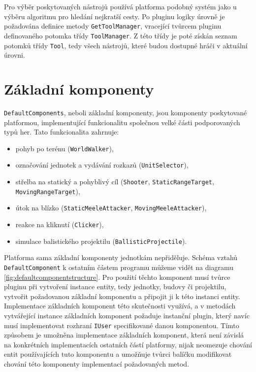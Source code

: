 Pro výběr poskytovaných nástrojů používá platforma podobný systém jako u výběru algoritmu pro hledání nejkratší cesty. Po pluginu logiky úrovně je požadována definice metody \texttt{GetToolManager}, vracející tvůrcem pluginu definovaného potomka třídy \texttt{ToolManager}. Z této třídy je poté získán seznam potomků třídy \texttt{Tool}, tedy všech nástrojů, které budou dostupné hráči v aktuální úrovni.

\section{Základní komponenty}
\label{sec:defaultcomponents}
\texttt{DefaultComponents}, neboli základní komponenty, jsou komponenty poskytované platformou, implementující funkcionalitu společnou velké části podporovaných typů her. Tato funkcionalita zahrnuje:

\begin{itemize}
	\item pohyb po terénu (\texttt{WorldWalker}),
	\item označování jednotek a vydávání rozkazů (\texttt{UnitSelector}),
	\item střelba na statický a pohyblivý cíl (\texttt{Shooter}, \texttt{StaticRangeTarget}, \texttt{MovingRangeTarget}),
	\item útok na blízko (\texttt{StaticMeeleAttacker}, \texttt{MovingMeeleAttacker}),
	\item reakce na kliknutí (\texttt{Clicker}),
	\item simulace balistického projektilu (\texttt{BallisticProjectile}).
\end{itemize}

Platforma sama základní komponenty jednotkám nepřiděluje. Schéma vztahů \texttt{DefaultComponent} k ostatním částem programu můžeme vidět na diagramu \ref{fig:defaultcomponentstructure}. Pro použití těchto komponent musí tvůrce pluginu při vytvoření instance entity, tedy jednotky, budovy či projektilu, vytvořit požadovanou základní komponentu a připojit ji k této instanci entity. Implementace základních komponent této skutečnosti využívá, a v metodách vytvářející instance základních komponent požaduje instanční plugin, který navíc musí implementovat rozhraní \texttt{IUser} specifikované danou komponentou. Tímto způsobem je umožněna implementace základních komponent, která není závislá na konkrétních implementacích ostatních částí platformy, nijak neomezuje chování entit používajících tuto komponentu a umožňuje tvůrci balíčku modifikovat chování této komponenty implementací požadovaných metod. 

